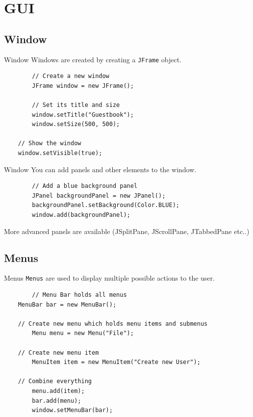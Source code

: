 \section{GUI}
\subsection{Window}
\begin{frame}[fragile]{Window}
  Windows are created by creating a \texttt{JFrame} object.
	\begin{lstlisting}
		// Create a new window
		JFrame window = new JFrame();

		// Set its title and size
		window.setTitle("Guestbook");
		window.setSize(500, 500);
    
    // Show the window
    window.setVisible(true);
	\end{lstlisting}
\end{frame}

\begin{frame}[fragile]{Window}
  You can add panels and other elements to the window.
	\begin{lstlisting}
		// Add a blue background panel
		JPanel backgroundPanel = new JPanel();
		backgroundPanel.setBackground(Color.BLUE);
		window.add(backgroundPanel);
	\end{lstlisting}

  More advanced panels are available (JSplitPane, JScrollPane, JTabbedPane etc..)
\end{frame}

\subsection{Menus}
\begin{frame}[fragile]{Menus}
  \texttt{Menus} are used to display multiple possible actions to the user.
	\begin{lstlisting}
		// Menu Bar holds all menus
    MenuBar bar = new MenuBar();
    
    // Create new menu which holds menu items and submenus
		Menu menu = new Menu("File");

    // Create new menu item 
		MenuItem item = new MenuItem("Create new User");
    
    // Combine everything
		menu.add(item);
		bar.add(menu);
		window.setMenuBar(bar);
	\end{lstlisting}
\end{frame}

